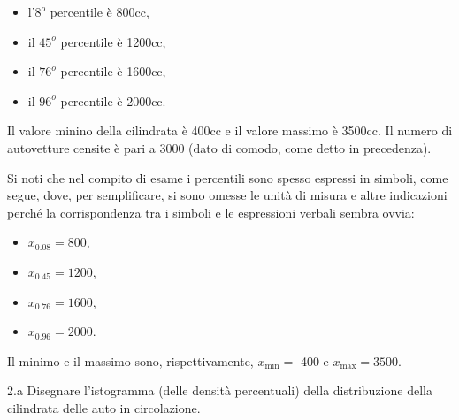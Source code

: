 \documentclass[
  11pt,
]{book}
\providecommand{\tightlist}{%
  \setlength{\itemsep}{0pt}\setlength{\parskip}{0pt}}
\theoremstyle{mytheoremstyle}
\theoremstyle{mydefstyle}
\begin{document}
\begin{itemize}
\tightlist
\item
  l'\(8^{o}\) percentile è 800cc,
\item
  il \(45^{o}\) percentile è 1200cc,
\item
  il \(76^{o}\) percentile è 1600cc,
\item
  il \(96^{o}\) percentile è 2000cc.
\end{itemize}

Il valore minino della cilindrata è 400cc e
il valore massimo è 3500cc.
Il numero di autovetture censite è pari a 3000
(dato di comodo, come detto in precedenza).

Si noti che nel compito di esame i percentili sono spesso
espressi in simboli, come segue, dove, per semplificare,
si sono omesse le unità di misura e altre indicazioni
perché la corrispondenza tra i simboli e le espressioni
verbali sembra ovvia:

\begin{itemize}
\tightlist
\item
  \(x_{0.08}= 800\),
\item
  \(x_{0.45}= 1200\),
\item
  \(x_{0.76}= 1600\),
\item
  \(x_{0.96}= 2000\).
\end{itemize}

Il minimo e il massimo sono, rispettivamente,
\(x_{\min}=\) 400 e \(x_{\max}= 3500\).

2.a Disegnare l'istogramma (delle densità percentuali) della
distribuzione della cilindrata delle auto in circolazione.
\end{document}
